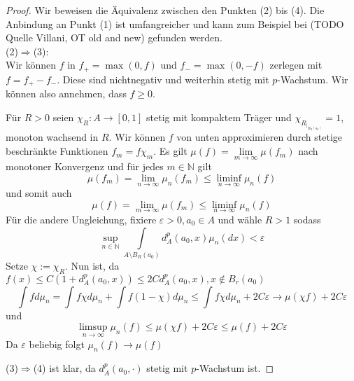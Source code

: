 \begin{proof}
Wir beweisen die Äquivalenz zwischen den Punkten (2) bis (4). Die Anbindung an Punkt (1) ist umfangreicher und kann zum Beispiel bei (TODO Quelle Villani, OT old and new) gefunden werden. \\ 

(2)$\Rightarrow$(3): \\
Wir können $f$ in $f_+ = \max(0, f)$ und $f_-=\max(0, -f)$ zerlegen mit $f=f_+-f_-$. Diese sind nichtnegativ und weiterhin stetig mit $p$-Wachstum. Wir können also annehmen, dass $f\geq 0$. 

Für $R>0$ seien $\chi_R:A\rightarrow[0,1]$ stetig mit kompaktem Träger und $\chi_{R_{\vert_{B_R(a_0)}}}=1$, monoton wachsend in $R$. Wir können $f$ von unten approximieren durch stetige beschränkte Funktionen $f_m = f\chi_m$. Es gilt $\mu(f) = \lim\limits_{m\rightarrow \infty} \mu(f_m)$ nach monotoner Konvergenz und für jedes $m \in \mathbb{N}$ gilt 
$$\mu(f_m) = \lim\limits_{n\rightarrow\infty}\mu_n(f_m) \leq \liminf\limits_{n\rightarrow\infty}\mu_n(f)$$
und somit auch 
$$\mu(f) = \lim_{m\rightarrow\infty} \mu(f_m) \leq \liminf\limits_{n\rightarrow\infty}\mu_n(f)$$
Für die andere Ungleichung, fixiere $\varepsilon>0, a_0 \in A$ und wähle $R>1$ sodass
$$\sup\limits_{n \in \mathbb{N}} \int\limits_{A\setminus B_R(a_0)}d_A^p(a_0, x)\mu_n(dx) < \varepsilon$$
Setze $\chi:=\chi_R$.
Nun ist, da $f(x)\leq C(1+d_A^p(a_0, x)) \leq 2Cd_A^p(a_0, x), x\notin B_r(a_0)$ 
$$\int fd\mu_n = \int f\chi d\mu_n + \int f(1-\chi)d\mu_n \leq \int f\chi d\mu_n + 2C\varepsilon \rightarrow \mu(\chi f) + 2C\varepsilon$$
und 
$$\limsup_{n\rightarrow\infty}\mu_n(f) \leq \mu(\chi f) + 2C\varepsilon \leq \mu(f) + 2C\varepsilon$$
Da $\varepsilon$ beliebig folgt $\mu_n(f) \rightarrow \mu(f)$

(3)$\Rightarrow$(4) ist klar, da $d^p_A(a_0, \cdot)$ stetig mit $p$-Wachstum ist.


\end{proof}
